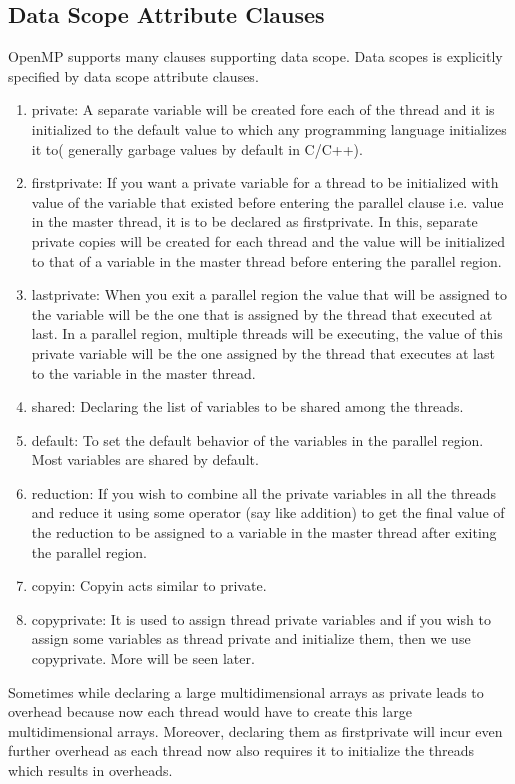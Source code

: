 \documentclass[12pt]{book}
\begin{document}
\subsection{Data Scope Attribute Clauses}
OpenMP supports many clauses supporting data scope. Data scopes is explicitly specified by data scope attribute clauses.

\begin{enumerate}
    \item private: A separate variable will be created fore each of the thread and it is initialized to the default value to which any programming language initializes it to( generally garbage values by default in C/C++).
    \item firstprivate:  If you want a private variable for a thread to be initialized with value of the variable that existed before entering the parallel clause i.e. value in the master thread, it is to be declared as firstprivate. In this, separate private copies will be created for each thread and the value will be initialized to that of a variable in the master thread before entering the parallel region.
    \item lastprivate: When you exit a parallel region the value that will be assigned to the variable will be the one that is assigned by the thread that executed at last. In a parallel region, multiple threads will be executing, the value of this private variable will be the one assigned by the thread that executes at last to the variable in the master thread.
    \item shared: Declaring the list of variables to be shared among the threads.
    \item default: To set the default behavior of the variables in the parallel region. Most variables are shared by default.
    \item reduction: If you wish to combine all the private variables in all the threads and reduce it using some operator (say like addition) to get the final value of the reduction to be assigned to a variable in the master thread after exiting the parallel region.
    \item copyin: Copyin acts similar to private.
    \item copyprivate: It is used to assign thread private variables and if you wish to assign some variables as thread private and initialize them, then we use copyprivate. More will be seen later.
\end{enumerate}
Sometimes while declaring a large multidimensional arrays as private leads to overhead because now each thread would have to create this large multidimensional arrays. Moreover, declaring them as firstprivate will incur even further overhead as each thread now also requires it to initialize the threads which results in overheads.
\end{document}
